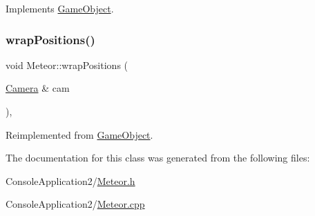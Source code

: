Implements \hyperlink{class_game_object_a93ed63df640deb516a020530e7f8e045}{Game\+Object}.

\hypertarget{class_meteor_a49fe47a23c6622f9850e81eac5c53ec2}{}\label{class_meteor_a49fe47a23c6622f9850e81eac5c53ec2} 
\subsubsection{\texorpdfstring{wrap\+Positions()}{wrapPositions()}}
{\footnotesize\ttfamily void Meteor\+::wrap\+Positions (\begin{DoxyParamCaption}\item[{\hyperlink{class_camera}{Camera} \&}]{cam }\end{DoxyParamCaption})\hspace{0.3cm}{\ttfamily [override]}, {\ttfamily [virtual]}}



Reimplemented from \hyperlink{class_game_object_a53b129d55688652e25e6515d80e669ca}{Game\+Object}.



The documentation for this class was generated from the following files\+:\begin{DoxyCompactItemize}
\item 
Console\+Application2/\hyperlink{_meteor_8h}{Meteor.\+h}\item 
Console\+Application2/\hyperlink{_meteor_8cpp}{Meteor.\+cpp}\end{DoxyCompactItemize}

